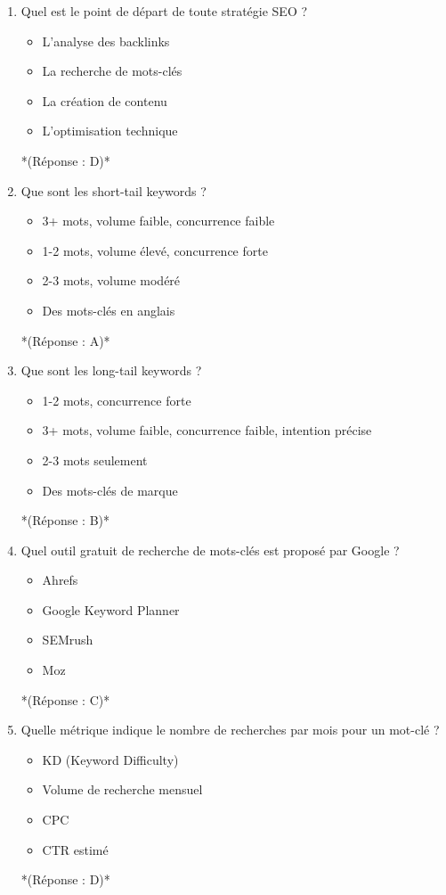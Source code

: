 \documentclass[12pt,a4paper,twoside]{report}
\begin{document}
\begin{enumerate}
\item Quel est le point de départ de toute stratégie SEO ?
\begin{itemize}
\item[A)] L'analyse des backlinks
\item[B)] La recherche de mots-clés
\item[C)] La création de contenu
\item[D)] L'optimisation technique
\end{itemize}
*(Réponse : D)*

\item Que sont les short-tail keywords ?
\begin{itemize}
\item[A)] 3+ mots, volume faible, concurrence faible
\item[B)] 1-2 mots, volume élevé, concurrence forte
\item[C)] 2-3 mots, volume modéré
\item[D)] Des mots-clés en anglais
\end{itemize}
*(Réponse : A)*

\item Que sont les long-tail keywords ?
\begin{itemize}
\item[A)] 1-2 mots, concurrence forte
\item[B)] 3+ mots, volume faible, concurrence faible, intention précise
\item[C)] 2-3 mots seulement
\item[D)] Des mots-clés de marque
\end{itemize}
*(Réponse : B)*

\item Quel outil gratuit de recherche de mots-clés est proposé par Google ?
\begin{itemize}
\item[A)] Ahrefs
\item[B)] Google Keyword Planner
\item[C)] SEMrush
\item[D)] Moz
\end{itemize}
*(Réponse : C)*

\item Quelle métrique indique le nombre de recherches par mois pour un mot-clé ?
\begin{itemize}
\item[A)] KD (Keyword Difficulty)
\item[B)] Volume de recherche mensuel
\item[C)] CPC
\item[D)] CTR estimé
\end{itemize}
*(Réponse : D)*


\end{enumerate}
\end{document}
